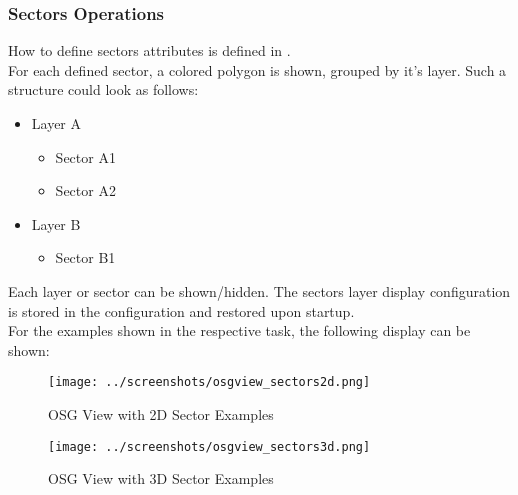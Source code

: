 \subsubsection{Sectors Operations}
\label{sec:osg_sectors_ops}  

How to define sectors attributes is defined in . \\

For each defined sector, a colored polygon is shown, grouped by it's layer. Such a structure could look as follows:

\begin{itemize}
 \item Layer A
 \begin{itemize}
 \item Sector A1
 \item Sector A2
\end{itemize} 
 \item Layer B
  \begin{itemize}
 \item Sector B1
\end{itemize} 
\end{itemize}

Each layer or sector can be shown/hidden. The sectors layer display configuration is stored in the configuration and restored upon startup. \\

For the examples shown in the respective task, the following display can be shown:

\begin{figure}[H]
    \hspace*{-2.5cm}
    \texttt{[image: ../screenshots/osgview\_sectors2d.png]}
  \caption{OSG View with 2D Sector Examples}
\end{figure}

\begin{figure}[H]
    \hspace*{-2.5cm}
    \texttt{[image: ../screenshots/osgview\_sectors3d.png]}
  \caption{OSG View with 3D Sector Examples}
\end{figure}
